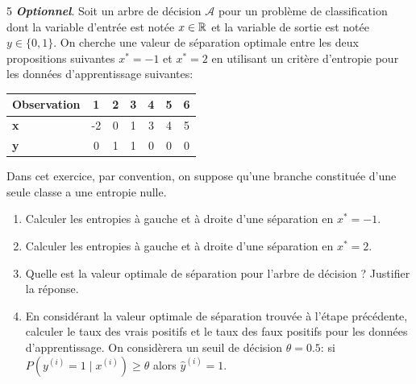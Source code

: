 \documentclass[solutions]{../cc}
\begin{document}
	\begin{exopoints}{5}
		\textit{\textbf{Optionnel}}. Soit un arbre de décision $\mathcal{A}$ pour un problème de classification dont la variable d'entrée est notée $x \in \mathbb{R}$ et la variable de sortie est notée $y \in \{0, 1\}$. On cherche une valeur de séparation optimale entre les deux propositions suivantes $x^* = -1$ et $x^* = 2$ en utilisant un critère d'entropie pour les données d'apprentissage suivantes:
		
		\begin{table}[h]
			\centering
			\begin{tabular}{|l|c|c|c|c|c|c|}
				\hline
				\textbf{Observation} & 1 & 2 & 3 & 4 & 5 & 6 \\
				\hline
				\textbf{x} & -2 & 0 & 1 & 3 & 4 & 5 \\
				\hline
				\textbf{y} & 0 & 1 & 1 & 0 & 0 & 0 \\
				\hline
			\end{tabular}
		\end{table}
		
		Dans cet exercice, par convention, on suppose qu'une branche constituée d'une seule classe a une entropie nulle. 
		\begin{enumerate}
			\item Calculer les entropies à gauche et à droite d'une séparation en $x^* = -1$. 
			\item Calculer les entropies à gauche et à droite d'une séparation en $x^* = 2$. 
			\item Quelle est la valeur optimale de séparation pour l'arbre de décision ? Justifier la réponse.
			\item En considérant la valeur optimale de séparation trouvée à l'étape précédente, calculer le taux des vrais positifs et le taux des faux positifs pour les données d'apprentissage. On considèrera un seuil de décision $\theta = 0.5$: si $P(y^{(i)} = 1 \mid x^{(i)}) \ge \theta$ alors $\hat{y}^{(i)} = 1$.
		\end{enumerate}			
	\end{exopoints}
\end{document}
